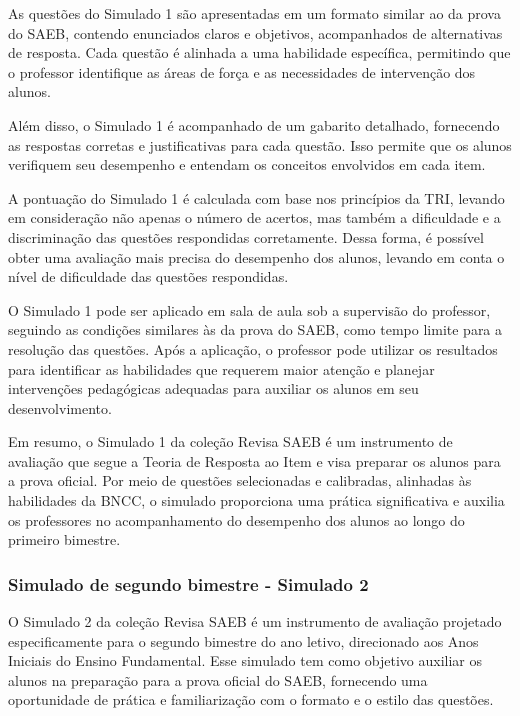 As questões do Simulado 1 são apresentadas em um formato similar ao da
prova do SAEB, contendo enunciados claros e objetivos, acompanhados de
alternativas de resposta. Cada questão é alinhada a uma habilidade
específica, permitindo que o professor identifique as áreas de força e
as necessidades de intervenção dos alunos.

Além disso, o Simulado 1 é acompanhado de um gabarito detalhado,
fornecendo as respostas corretas e justificativas para cada questão.
Isso permite que os alunos verifiquem seu desempenho e entendam os
conceitos envolvidos em cada item.

A pontuação do Simulado 1 é calculada com base nos princípios da TRI,
levando em consideração não apenas o número de acertos, mas também a
dificuldade e a discriminação das questões respondidas corretamente.
Dessa forma, é possível obter uma avaliação mais precisa do desempenho
dos alunos, levando em conta o nível de dificuldade das questões
respondidas.

O Simulado 1 pode ser aplicado em sala de aula sob a supervisão do
professor, seguindo as condições similares às da prova do SAEB, como
tempo limite para a resolução das questões. Após a aplicação, o
professor pode utilizar os resultados para identificar as habilidades
que requerem maior atenção e planejar intervenções pedagógicas adequadas
para auxiliar os alunos em seu desenvolvimento.

Em resumo, o Simulado 1 da coleção Revisa SAEB é um instrumento de avaliação que segue
a Teoria de Resposta ao Item e visa preparar os alunos para a prova
oficial. Por meio de questões selecionadas e calibradas, alinhadas às
habilidades da BNCC, o simulado proporciona uma prática significativa e
auxilia os professores no acompanhamento do desempenho dos alunos ao
longo do primeiro bimestre.

\subsubsection{Simulado de segundo bimestre - Simulado
2}\label{simulado-de-segundo-bimestre---simulado-2}

O Simulado 2 da coleção Revisa SAEB é um instrumento de avaliação projetado
especificamente para o segundo bimestre do ano letivo, direcionado aos
Anos Iniciais do Ensino Fundamental. Esse simulado tem como objetivo
auxiliar os alunos na preparação para a prova oficial do SAEB,
fornecendo uma oportunidade de prática e familiarização com o formato e
o estilo das questões.

